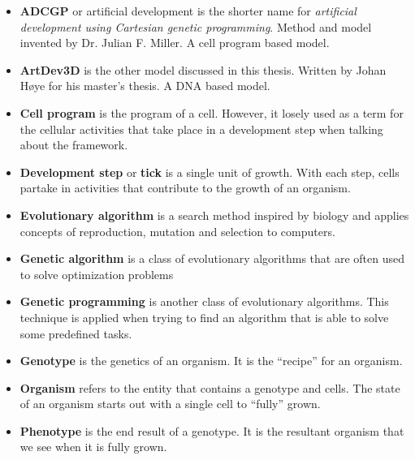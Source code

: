 \begin{itemize}
\itemsep=0pt
	\item\textbf{ADCGP} or artificial development is the shorter name for \emph{artificial development using Cartesian genetic programming}. Method and model invented by Dr. Julian F. Miller. A cell program based model.
	\item\textbf{ArtDev3D} is the other model discussed in this thesis. Written by Johan H{\o}ye for his master's thesis. A DNA based model.
	\item\textbf{Cell program} is the program of a cell. However, it losely used as a term for the cellular activities that take place in a development step when talking about the framework.
	\item\textbf{Development step} or \textbf{tick} is a single unit of growth. With each step, cells partake in activities that contribute to the growth of an organism.
	\item\textbf{Evolutionary algorithm} is a search method inspired by biology and applies concepts of reproduction, mutation and selection to computers.
	\item\textbf{Genetic algorithm} is a class of evolutionary algorithms that are often used to solve optimization problems
	\item\textbf{Genetic programming} is another class of evolutionary algorithms. This technique is applied when trying to find an algorithm that is able to solve some predefined tasks.
	\item\textbf{Genotype} is the genetics of an organism. It is the ``recipe'' for an organism.
	\item\textbf{Organism} refers to the entity that contains a genotype and cells. The state of an organism starts out with a single cell to ``fully'' grown.
	\item\textbf{Phenotype} is the end result of a genotype. It is the resultant organism that we see when it is fully grown.
\end{itemize}

